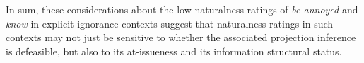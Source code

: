 \documentclass[11pt,fleqn]{article}
\newcommand{\6}{\mbox{$[\hspace*{-.6mm}[$}}
\newcommand{\9}{\mbox{$]\hspace*{-.6mm}]$}}
\begin{document}

In sum, these considerations about the low naturalness ratings of \emph{be annoyed} and \emph{know} in explicit ignorance contexts suggest that naturalness ratings in such contexts may not just be sensitive to whether the associated projection inference is defeasible, but also to its at-issueness and its information structural status. %

\end{document}
